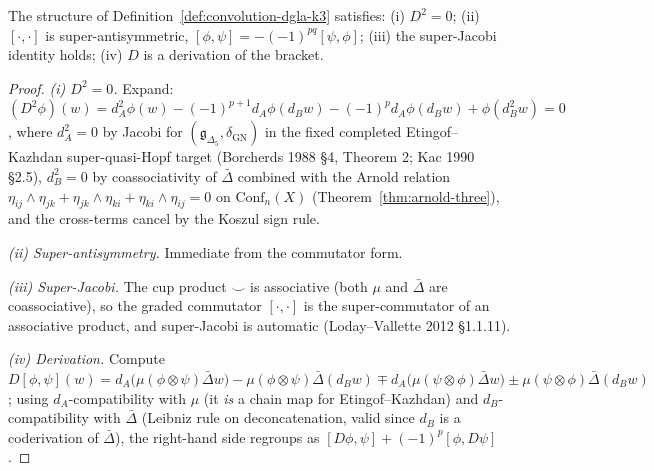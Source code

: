 \begin{proposition}
\label{prop:dgla-axioms-k3-convolution}
The structure of Definition~\ref{def:convolution-dgla-k3} satisfies:
\textup{(i)} $D^2 = 0$; \textup{(ii)} $[\cdot,\cdot]$ is super-antisymmetric,
$[\phi,\psi] = -(-1)^{pq}[\psi,\phi]$; \textup{(iii)} the super-Jacobi
identity holds; \textup{(iv)} $D$ is a derivation of the bracket.
\end{proposition}

\begin{proof}
\emph{(i) $D^2 = 0$.} Expand:
$(D^2\phi)(w) = d_A^2\phi(w) - (-1)^{p+1}d_A\phi(d_B w)
- (-1)^p d_A\phi(d_B w) + \phi(d_B^2 w) = 0$,
where $d_A^2 = 0$ by Jacobi for
$(\mathfrak{g}_{\Delta_5},\delta_{\mathrm{GN}})$ in the fixed
completed Etingof--Kazhdan super-quasi-Hopf target
(Borcherds 1988 \S 4, Theorem 2; Kac 1990 \S 2.5), $d_B^2 = 0$ by
coassociativity of $\bar\Delta$ combined
with the Arnold relation
$\eta_{ij}\wedge\eta_{jk} + \eta_{jk}\wedge\eta_{ki} +
\eta_{ki}\wedge\eta_{ij} = 0$
on $\mathrm{Conf}_n(X)$ (Theorem~\ref{thm:arnold-three}), and the
cross-terms cancel by the Koszul sign rule.

\emph{(ii) Super-antisymmetry.} Immediate from the commutator form.

\emph{(iii) Super-Jacobi.} The cup product $\smile$ is associative
(both $\mu$ and $\bar\Delta$ are coassociative), so the graded
commutator $[\cdot,\cdot]$ is the super-commutator of an associative
product, and super-Jacobi is automatic
(Loday--Vallette 2012 \S 1.1.11).

\emph{(iv) Derivation.} Compute
$D[\phi,\psi](w) = d_A\bigl(\mu(\phi\otimes\psi)\bar\Delta w\bigr)
- \mu(\phi\otimes\psi)\bar\Delta(d_B w) \mp
d_A\bigl(\mu(\psi\otimes\phi)\bar\Delta w\bigr) \pm
\mu(\psi\otimes\phi)\bar\Delta(d_B w)$;
using $d_A$-compatibility with $\mu$ (it \emph{is} a chain map for
Etingof--Kazhdan) and $d_B$-compatibility with $\bar\Delta$
(Leibniz rule on deconcatenation, valid since $d_B$ is a
coderivation of $\bar\Delta$), the right-hand side regroups as
$[D\phi,\psi] + (-1)^p[\phi,D\psi]$.
\end{proof}

